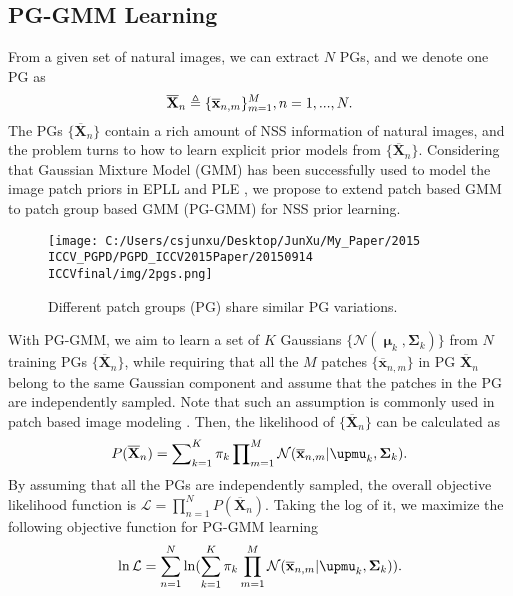 \subsection{PG-GMM Learning}
From a given set of natural images, we can extract $N$ PGs, and we denote one PG as
\begin{equation}\label{equ2}
\setlength{\abovedisplayskip}{2pt}
\setlength{\belowdisplayskip}{2pt}
\mathbf{\overline{X}}_{n}\triangleq \{\mathbf{\overline{x}}_{n,m}\}_{m=1}^{M}, n=1,...,N.
\end{equation}
The PGs $\{\mathbf{\overline{X}}_{n}\}$ contain a rich amount of NSS information of natural images, and the problem turns to how to learn explicit prior models from $\{\mathbf{\overline{X}}_{n}\}$. Considering that Gaussian Mixture Model (GMM) has been successfully used to model the image patch priors in EPLL \cite{epll} and PLE \cite{ple}, we propose to extend patch based GMM to patch group based GMM (PG-GMM) for NSS prior learning.
\begin{figure}
\centering
\centering
\texttt{[image: C:/Users/csjunxu/Desktop/JunXu/My\_Paper/2015 ICCV\_PGPD/PGPD\_ICCV2015Paper/20150914 ICCVfinal/img/2pgs.png]}
\vspace{-0.05in}
\caption{Different patch groups (PG) share similar PG variations.}
\vspace{-0.15in}
\label{fig2}
\end{figure}

With PG-GMM, we aim to learn a set of $K$ Gaussians $\{\mathcal{N}(\boldsymbol{\upmu}_{k},\mathbf{\Sigma}_{k})\}$ from $N$ training PGs $\{\mathbf{\overline{X}}_{n}\}$, while requiring that all the $M$ patches $\{\mathbf{\overline{x}}_{n,m}\}$  in PG $\mathbf{\overline{X}}_{n}$ belong to the same Gaussian component and assume that the patches in the PG are independently sampled. Note that such an assumption is commonly used in patch based image modeling \cite{ksvd,lssc}. Then, the likelihood of $\{\mathbf{\overline{X}}_{n}\}$ can be calculated as
\begin{equation}\label{equ3}
\setlength{\abovedisplayskip}{3pt}
\setlength{\belowdisplayskip}{3pt}
P(\mathbf{\overline{X}}_{n})  = \sum\nolimits_{k=1}^{K}\pi_{k}\prod\nolimits_{m=1}^{M}\mathcal{N}(\mathbf{\overline{x}}_{n,m}|\boldsymbol{\upmu}_{k},\mathbf{\Sigma}_{k}).
\end{equation}
By assuming that all the PGs are independently sampled, the overall objective likelihood function is $\mathcal{L} = \prod_{n=1}^{N}P(\mathbf{\overline{X}}_{n})$. Taking the log of it, we maximize the following objective function for PG-GMM learning
\begin{equation}\label{equ4}
\setlength{\abovedisplayskip}{3pt}
\setlength{\belowdisplayskip}{3pt}
\begin{split}
\ln\mathcal{L}=\sum_{n=1}^{N} \ln(\sum_{k=1}^{K}\pi_{k}\prod_{m=1}^{M}\mathcal{N}(\mathbf{\overline{x}}_{n,m}|\boldsymbol{\upmu}_{k},\mathbf{\Sigma}_{k})).
\end{split}
\end{equation}

